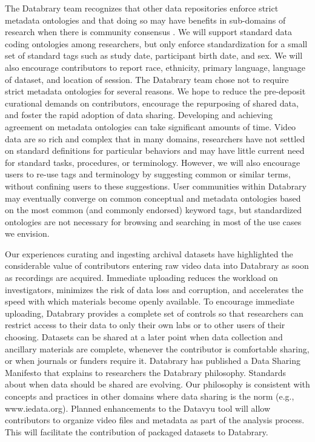 \documentclass{sig-alternate}
\begin{document}
The Databrary team recognizes that other data repositories enforce
strict metadata ontologies and that doing so may have benefits in
sub-domains of research when there is community consensus \cite{cogatlas}. We will
support standard data coding ontologies among researchers, but only
enforce standardization for a small set of standard tags such as study
date, participant birth date, and sex. We will also encourage
contributors to report race, ethnicity, primary language, language of
dataset, and location of session. The Databrary team chose not to
require strict metadata ontologies for several reasons. We hope to
reduce the pre-deposit curational demands on contributors, encourage the
repurposing of shared data, and foster the rapid adoption of data
sharing. Developing and achieving agreement on metadata ontologies can
take significant amounts of time. Video data are so rich and complex
that in many domains, researchers have not settled on standard
definitions for particular behaviors and may have little current need
for standard tasks, procedures, or terminology. However, we will also
encourage users to re-use tags and terminology by suggesting common or
similar terms, without confining users to these suggestions. User
communities within Databrary may eventually converge on common
conceptual and metadata ontologies based on the most common (and
commonly endorsed) keyword tags, but standardized ontologies are not
necessary for browsing and searching in most of the use cases we
envision.

Our experiences curating and ingesting archival datasets have
highlighted the considerable value of contributors entering raw video
data into Databrary as soon as recordings are acquired. Immediate
uploading reduces the workload on investigators, minimizes the risk of
data loss and corruption, and accelerates the speed with which materials
become openly available. To encourage immediate uploading, Databrary
provides a complete set of controls so that researchers can restrict
access to their data to only their own labs or to other users of their
choosing. Datasets can be shared at a later point when data collection
and ancillary materials are complete, whenever the contributor is
comfortable sharing, or when journals or funders require it. Databrary
has published a Data Sharing Manifesto \cite{manifesto} that explains to researchers
the Databrary philosophy. Standards about when data should be shared are
evolving. Our philosophy is consistent with concepts and practices in
other domains where data sharing is the norm (e.g., www.iedata.org).
Planned enhancements to the Datavyu tool will allow contributors to
organize video files and metadata as part of the analysis process. This
will facilitate the contribution of packaged datasets to Databrary.
\end{document}
